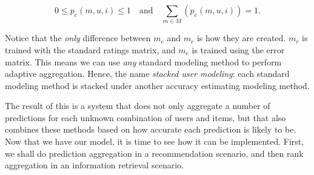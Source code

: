 \begin{equation*}
  0 \leq p_{e}(m,u,i) \leq 1 \quad \text{and} \quad \sum_{m \in M} (p_{e}(m,u,i)) = 1.
\end{equation*}

Notice that the \emph{only} difference between $m_e$ and $m_r$ is how they are created.
$m_r$ is trained with the standard ratings matrix, and $m_e$ is trained using the error matrix.
This means we can use \emph{any} standard modeling method to perform adaptive aggregation.
Hence, the name \emph{stacked user modeling}: 
each standard modeling method is stacked under another accuracy estimating modeling method.

The result of this is a system that does not only aggregate a number of predictions for each unknown
combination of users and items,
but that also combines these methods based on how accurate each prediction is likely to be.
Now that we have our model, it is time to see how it can be implemented.
First, we shall do prediction aggregation in a recommendation scenario,
and then rank aggregation in an information retrieval scenario.

\clearpage
